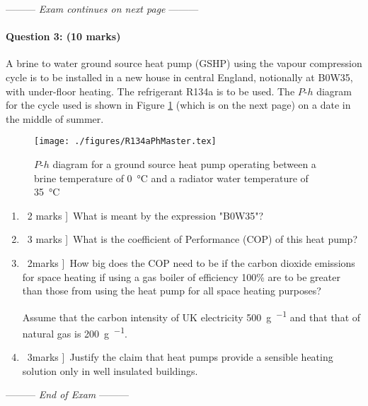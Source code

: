 \documentclass[a4paper,12pt,fleqn]{article}
\newcommand{\middlewords}{Exam continues on next page}
\newcommand{\lastwords}{End of Exam}
\begin{document}
\begin{center}
\vspace{3cm}
--------- \textit{\middlewords} ---------
\end{center}
\newpage\newpage

\paragraph{\textbf{Question 3: (10 marks)}}


A brine to water ground source heat pump (GSHP) using the vapour compression cycle is to be installed in a new house in central England, notionally at B0W35, with under-floor heating. The refrigerant R134a is to be used. The $P$-$h$ diagram for the cycle used is shown in Figure \ref{figure:q4a} (which is on the next page) on a date in the middle of summer.
\begin{figure}[h]
\centering
\texttt{[image: ./figures/R134aPhMaster.tex]}
\caption{$P$-$h$ diagram for a ground source heat pump operating between a brine temperature of \SI{0}{\celsius} and a radiator water temperature of \SI{35}{\celsius}}
\label{figure:q4a}
\end{figure}

\begin{enumerate} [label=\alph*)]
\item \lbrack\ 2 marks ]\ What is meant by the expression "B0W35"?
\item \lbrack\ 3 marks ]\ What is the coefficient of Performance (COP) of this heat pump?
\item \lbrack\ 2marks ]\ How big does the COP need to be if the carbon dioxide emissions for space heating if using a gas boiler of efficiency 100\% are to be greater than those from using the heat pump for all space heating purposes? \par
Assume that the carbon intensity of UK electricity \SI{500}{\gram\per\kilowatthour} and that that of natural gas is \SI{200}{\gram\per\kilowatthour}.
\item \lbrack\ 3marks ]\ Justify the claim that heat pumps provide a sensible heating solution only in well insulated buildings.
\end{enumerate}
\begin{center}
\vspace{3cm}
--------- \textit{\lastwords} ---------
\end{center}


\label{finalpage}

\end{document}
